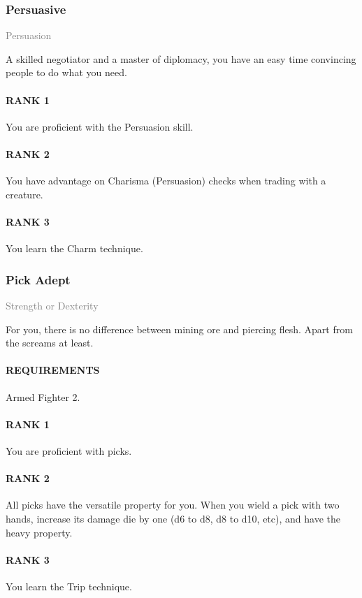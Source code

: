 \subsubsection{Persuasive} \label{feat::persuasive}
\small{\textcolor{gray}{Persuasion}}

\normalsize
A skilled negotiator and a master of diplomacy, you have an easy time convincing people to do what you need.
\paragraph{RANK 1} You are proficient with the Persuasion skill.
\paragraph{RANK 2} You have advantage on Charisma (Persuasion) checks when trading with a creature.
\paragraph{RANK 3} You learn the Charm technique.

\subsubsection{Pick Adept} \label{feat::pickadept}
\small{\textcolor{gray}{Strength or Dexterity}}

\normalsize
For you, there is no difference between mining ore and piercing flesh.
Apart from the screams at least.
\paragraph{REQUIREMENTS} Armed Fighter 2.
\paragraph{RANK 1} You are proficient with picks.
\paragraph{RANK 2} All picks have the versatile property for you.
When you wield a pick with two hands, increase its damage die by one (d6 to d8, d8 to d10, etc), and have the heavy property.
\paragraph{RANK 3} You learn the Trip technique.

